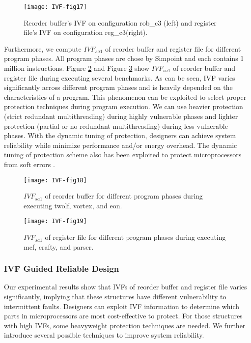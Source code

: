 \begin{figure}[t]
    \centering
    \texttt{[image: IVF-fig17]}\\
    \caption{Reorder buffer's IVF on configuration rob\_c3 (left) and register file's IVF on configuration reg\_c3(right).}
    \label{fig:ROB-IVF-C3}
\end{figure}

Furthermore, we compute $IVF_{sa1}$ of reorder buffer and register file for different program phases. All program phases are chose by Simpoint \cite{sherwood2002automatically} and each contains 1 million instructions. Figure \ref{fig:ROB-IVF-sa1} and Figure \ref{fig:RF-IVF-sa1} show $IVF_{sa1}$ of reorder buffer and register file during executing several benchmarks. As can be seen, IVF varies significantly across different program phases and is heavily depended on the characteristics of a program. This phenomenon can be exploited to select proper protection techniques during program execution. We can use heavier protection (strict redundant multithreading) during highly vulnerable phases and lighter protection (partial or no redundant multithreading) during less vulnerable phases. With the dynamic tuning of protection, designers can achieve system reliability while minimize performance and/or energy overhead. The dynamic tuning of protection scheme also has been exploited to protect microprocessors from soft errors \cite{walcott2007dynamic}.

\begin{figure}[t]
    \centering
    \texttt{[image: IVF-fig18]}\\
    \caption{$IVF_{sa1}$ of reorder buffer for different program phases during executing twolf, vortex, and eon.}
    \label{fig:ROB-IVF-sa1}
\end{figure}

\begin{figure}[t]
    \centering
    \texttt{[image: IVF-fig19]}\\
    \caption{$IVF_{sa1}$ of register file for different program phases during executing mcf, crafty, and parser.}
    \label{fig:RF-IVF-sa1}
\end{figure}


\subsubsection{IVF Guided Reliable Design}
Our experimental results show that IVFs of reorder buffer and register file varies significantly, implying that these structures have different vulnerability to intermittent faults. Designers can exploit IVF information to determine which parts in microprocessors are most cost-effective to protect. For those structures with high IVFs, some heavyweight protection techniques are needed. We further introduce several possible techniques to improve system reliability.

